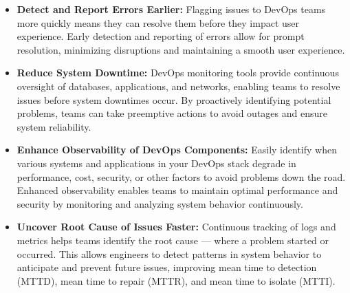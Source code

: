 \begin{itemize}
  \item \textbf{Detect and Report Errors Earlier:}
  Flagging issues to DevOps teams more quickly means they can resolve them before they impact user experience. Early detection and reporting of errors allow for prompt resolution, minimizing disruptions and maintaining a smooth user experience.
  \item \textbf{Reduce System Downtime:}
  DevOps monitoring tools provide continuous oversight of databases, applications, and networks, enabling teams to resolve issues before system downtimes occur. By proactively identifying potential problems, teams can take preemptive actions to avoid outages and ensure system reliability.
  \item \textbf{Enhance Observability of DevOps Components:}
  Easily identify when various systems and applications in your DevOps stack degrade in performance, cost, security, or other factors to avoid problems down the road. Enhanced observability enables teams to maintain optimal performance and security by monitoring and analyzing system behavior continuously.

  \item \textbf{Uncover Root Cause of Issues Faster:}
  Continuous tracking of logs and metrics helps teams identify the root cause — where a problem started or occurred. This allows engineers to detect patterns in system behavior to anticipate and prevent future issues, improving mean time to detection (MTTD), mean time to repair (MTTR), and mean time to isolate (MTTI).
\end{itemize}

